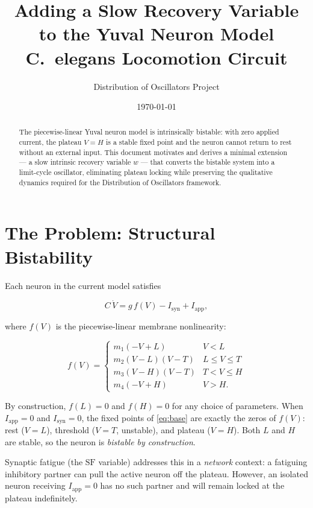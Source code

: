 \documentclass[11pt]{article}
\title{Adding a Slow Recovery Variable to the Yuval Neuron Model\\
\large C.\ elegans Locomotion Circuit}
\author{Distribution of Oscillators Project}
\date{\today}
\begin{document}
\maketitle

\begin{abstract}
The piecewise-linear Yuval neuron model is intrinsically bistable: with zero applied current,
the plateau $V = H$ is a stable fixed point and the neuron cannot return to rest without
an external input. This document motivates and derives a minimal extension --- a slow
intrinsic recovery variable $w$ --- that converts the bistable system into a limit-cycle
oscillator, eliminating plateau locking while preserving the qualitative dynamics required
for the Distribution of Oscillators framework.
\end{abstract}

\section{The Problem: Structural Bistability}

Each neuron in the current model satisfies

\begin{equation}
    C\,\dot{V} = g\,f(V) - I_{\mathrm{syn}} + I_{\mathrm{app}},
    \label{eq:base}
\end{equation}

where $f(V)$ is the piecewise-linear membrane nonlinearity:

\begin{equation}
f(V) = \begin{cases}
    m_1(-V + L)         & V < L \\
    m_2(V - L)(V - T)   & L \leq V \leq T \\
    m_3(V - H)(V - T)   & T < V \leq H \\
    m_4(-V + H)         & V > H.
\end{cases}
\label{eq:fv}
\end{equation}

By construction, $f(L) = 0$ and $f(H) = 0$ for any choice of parameters. When
$I_{\mathrm{app}} = 0$ and $I_{\mathrm{syn}} = 0$, the fixed points of
\eqref{eq:base} are exactly the zeros of $f(V)$: rest ($V = L$), threshold ($V = T$,
unstable), and plateau ($V = H$). Both $L$ and $H$ are stable, so the neuron is
\emph{bistable by construction}.

Synaptic fatigue (the $\mathrm{SF}$ variable) addresses this in a \emph{network} context:
a fatiguing inhibitory partner can pull the active neuron off the plateau. However, an
isolated neuron receiving $I_{\mathrm{app}} = 0$ has no such partner and will remain
locked at the plateau indefinitely.
\end{document}
